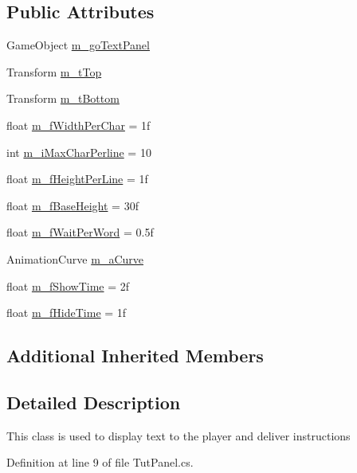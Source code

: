 \subsection*{Public Attributes}
\begin{DoxyCompactItemize}
\item 
Game\+Object \mbox{\hyperlink{class_tut_panel_af626bfe49ba0abaaf934790c86304539}{m\+\_\+go\+Text\+Panel}}
\item 
Transform \mbox{\hyperlink{class_tut_panel_a58404ecfd155e75dd7c296fe4a581d81}{m\+\_\+t\+Top}}
\item 
Transform \mbox{\hyperlink{class_tut_panel_ac828602c4d402cf02854a331a5709844}{m\+\_\+t\+Bottom}}
\item 
float \mbox{\hyperlink{class_tut_panel_a0337101e09722520462066030a98739d}{m\+\_\+f\+Width\+Per\+Char}} = 1f
\item 
int \mbox{\hyperlink{class_tut_panel_aa9b31e4b6bbbb00964c3ac30b33dbec3}{m\+\_\+i\+Max\+Char\+Perline}} = 10
\item 
float \mbox{\hyperlink{class_tut_panel_a721439ce1fbce9eca43ec78a89503927}{m\+\_\+f\+Height\+Per\+Line}} = 1f
\item 
float \mbox{\hyperlink{class_tut_panel_a640bbf40fd31c98582602b635c2741da}{m\+\_\+f\+Base\+Height}} = 30f
\item 
float \mbox{\hyperlink{class_tut_panel_a424e1c1a19d81e66a5b1896d1191dce2}{m\+\_\+f\+Wait\+Per\+Word}} = 0.\+5f
\item 
Animation\+Curve \mbox{\hyperlink{class_tut_panel_aace257a95f38d116378d58c446ccbdc4}{m\+\_\+a\+Curve}}
\item 
float \mbox{\hyperlink{class_tut_panel_aec28b516fcecfc8db13754f62cd2018f}{m\+\_\+f\+Show\+Time}} = 2f
\item 
float \mbox{\hyperlink{class_tut_panel_a9c7f44c85f634f62e0e4e7061eb95f61}{m\+\_\+f\+Hide\+Time}} = 1f
\end{DoxyCompactItemize}
\subsection*{Additional Inherited Members}


\subsection{Detailed Description}
This class is used to display text to the player and deliver instructions 



Definition at line 9 of file Tut\+Panel.\+cs.



